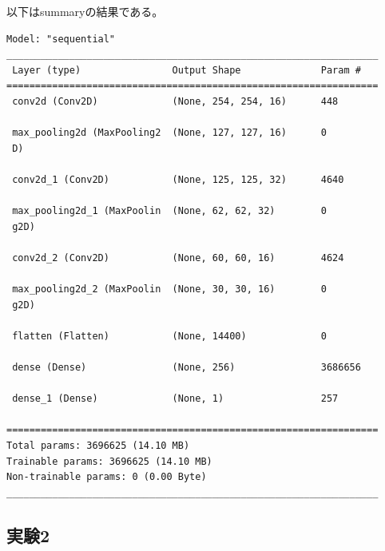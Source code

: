 \documentclass[a4paper, 11pt, titlepage]{jsarticle}
\begin{document}
以下はsummaryの結果である。\par
{\fontsize{10pt}{9pt}\selectfont
\begin{verbatim}
Model: "sequential"
_________________________________________________________________
 Layer (type)                Output Shape              Param #   
=================================================================
 conv2d (Conv2D)             (None, 254, 254, 16)      448       
                                                                 
 max_pooling2d (MaxPooling2  (None, 127, 127, 16)      0         
 D)                                                              
                                                                 
 conv2d_1 (Conv2D)           (None, 125, 125, 32)      4640      
                                                                 
 max_pooling2d_1 (MaxPoolin  (None, 62, 62, 32)        0         
 g2D)                                                            
                                                                 
 conv2d_2 (Conv2D)           (None, 60, 60, 16)        4624      
                                                                 
 max_pooling2d_2 (MaxPoolin  (None, 30, 30, 16)        0         
 g2D)                                                            
                                                                 
 flatten (Flatten)           (None, 14400)             0         
                                                                 
 dense (Dense)               (None, 256)               3686656   
                                                                 
 dense_1 (Dense)             (None, 1)                 257       
                                                                 
=================================================================
Total params: 3696625 (14.10 MB)
Trainable params: 3696625 (14.10 MB)
Non-trainable params: 0 (0.00 Byte)
_________________________________________________________________
\end{verbatim}
}


\subsection{実験2}
\end{document}
